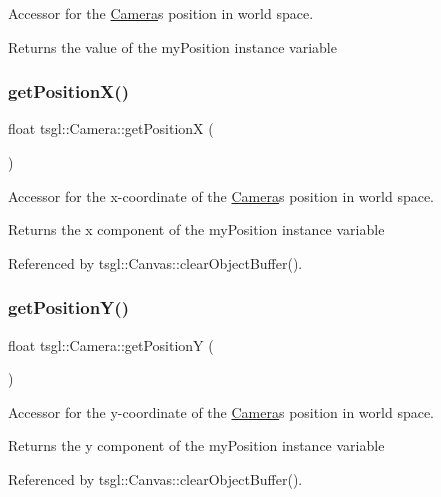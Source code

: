 Accessor for the \hyperlink{classtsgl_1_1_camera}{Camera}\textquotesingle{}s position in world space. 

Returns the value of the my\+Position instance variable \mbox{\label{classtsgl_1_1_camera_abd7723919bb264f1e4a9fd666a280c8d}} 
\subsubsection{\texorpdfstring{get\+Position\+X()}{getPositionX()}}
{\footnotesize\ttfamily float tsgl\+::\+Camera\+::get\+PositionX (\begin{DoxyParamCaption}{ }\end{DoxyParamCaption})}



Accessor for the x-\/coordinate of the \hyperlink{classtsgl_1_1_camera}{Camera}\textquotesingle{}s position in world space. 

Returns the x component of the my\+Position instance variable 

Referenced by tsgl\+::\+Canvas\+::clear\+Object\+Buffer().

\mbox{\label{classtsgl_1_1_camera_a14bb7fed2c2772b927dcd9f37807201e}} 
\subsubsection{\texorpdfstring{get\+Position\+Y()}{getPositionY()}}
{\footnotesize\ttfamily float tsgl\+::\+Camera\+::get\+PositionY (\begin{DoxyParamCaption}{ }\end{DoxyParamCaption})}



Accessor for the y-\/coordinate of the \hyperlink{classtsgl_1_1_camera}{Camera}\textquotesingle{}s position in world space. 

Returns the y component of the my\+Position instance variable 

Referenced by tsgl\+::\+Canvas\+::clear\+Object\+Buffer().

\mbox{\label{classtsgl_1_1_camera_a73a1acb7ff3a1166e2d6a4be16874219}} 
